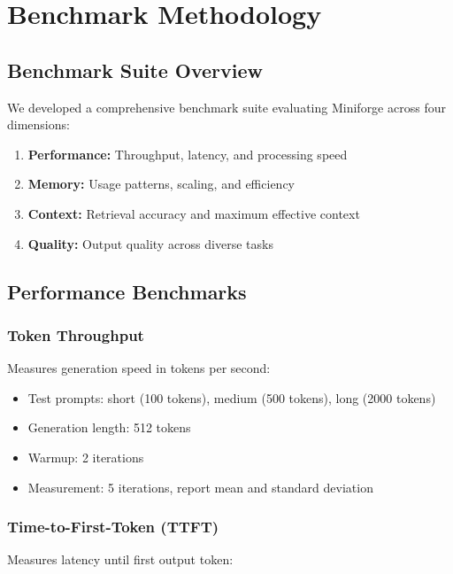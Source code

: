 \section{Benchmark Methodology}
\label{sec:benchmarks}

\subsection{Benchmark Suite Overview}

We developed a comprehensive benchmark suite evaluating Miniforge across four dimensions:

\begin{enumerate}
    \item \textbf{Performance:} Throughput, latency, and processing speed
    \item \textbf{Memory:} Usage patterns, scaling, and efficiency
    \item \textbf{Context:} Retrieval accuracy and maximum effective context
    \item \textbf{Quality:} Output quality across diverse tasks
\end{enumerate}

\subsection{Performance Benchmarks}

\subsubsection{Token Throughput}

Measures generation speed in tokens per second:

\begin{itemize}
    \item Test prompts: short (100 tokens), medium (500 tokens), long (2000 tokens)
    \item Generation length: 512 tokens
    \item Warmup: 2 iterations
    \item Measurement: 5 iterations, report mean and standard deviation
\end{itemize}

\subsubsection{Time-to-First-Token (TTFT)}

Measures latency until first output token:

